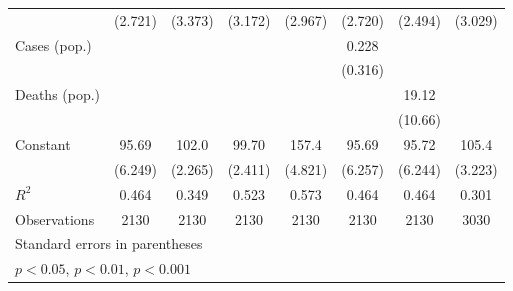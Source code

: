 \documentclass{article}
\begin{document}
{\begin{longtable}{l*{7}{c}}
                &  (2.721)         &  (3.373)         &  (3.172)         &  (2.967)         &  (2.720)         &  (2.494)         &  (3.029)         \\
Cases (pop.)    &                  &                  &                  &                  &    0.228         &                  &                  \\
                &                  &                  &                  &                  &  (0.316)         &                  &                  \\
Deaths (pop.)   &                  &                  &                  &                  &                  &    19.12         &                  \\
                &                  &                  &                  &                  &                  &  (10.66)         &                  \\
Constant        &    95.69\sym{***}&    102.0\sym{***}&    99.70\sym{***}&    157.4\sym{***}&    95.69\sym{***}&    95.72\sym{***}&    105.4\sym{***}\\
                &  (6.249)         &  (2.265)         &  (2.411)         &  (4.821)         &  (6.257)         &  (6.244)         &  (3.223)         \\
\hline
\(R^{2}\)       &    0.464         &    0.349         &    0.523         &    0.573         &    0.464         &    0.464         &    0.301         \\
Observations    &     2130         &     2130         &     2130         &     2130         &     2130         &     2130         &     3030         \\
\hline\hline
\multicolumn{8}{l}{\footnotesize Standard errors in parentheses}\\
\multicolumn{8}{l}{\footnotesize \sym{*} \(p<0.05\), \sym{**} \(p<0.01\), \sym{***} \(p<0.001\)}\\
\end{longtable}
}
\end{document}
